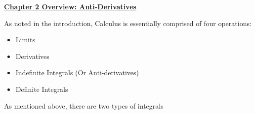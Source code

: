\textbf{\underline{\large{Chapter 2 Overview: Anti-Derivatives}}} \par

As noted in the introduction, Calculus is essentially comprised of four operations: \begin{itemize}
    \item Limits
    \item Derivatives
    \item Indefinite Integrals (Or Anti-derivatives)
    \item Definite Integrals
\end{itemize}

As mentioned above, there are two types of integrals 